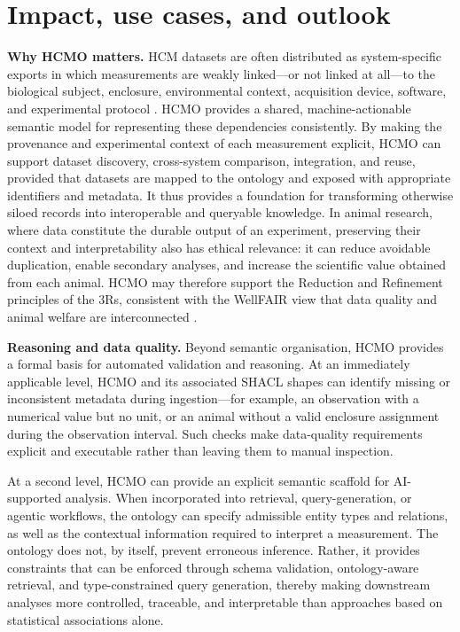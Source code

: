 \section{Impact, use cases, and outlook}
\textbf{Why HCMO matters.} HCM datasets are often distributed as system-specific exports in which measurements are weakly linked—or not linked at all—to the biological subject, enclosure, environmental context, acquisition device, software, and experimental protocol \cite{bains2025,forrest2026,petit2026wellfair}. HCMO provides a shared, machine-actionable semantic model for representing these dependencies consistently. By making the provenance and experimental context of each measurement explicit, HCMO can support dataset discovery, cross-system comparison, integration, and reuse, provided that datasets are mapped to the ontology and exposed with appropriate identifiers and metadata. It thus provides a foundation for transforming otherwise siloed records into interoperable and queryable knowledge. In animal research, where data constitute the durable output of an experiment, preserving their context and interpretability also has ethical relevance: it can reduce avoidable duplication, enable secondary analyses, and increase the scientific value obtained from each animal. HCMO may therefore support the Reduction and Refinement principles of the 3Rs, consistent with the WellFAIR view that data quality and animal welfare are interconnected \cite{petit2026wellfair}.

\textbf{Reasoning and data quality.}
Beyond semantic organisation, HCMO provides a formal basis for automated validation and reasoning. At an immediately applicable level, HCMO and its associated SHACL shapes can identify missing or inconsistent metadata during ingestion---for example, an observation with a numerical value but no unit, or an animal without a valid enclosure assignment during the observation interval. Such checks make data-quality requirements explicit and executable rather than leaving them to manual inspection.

At a second level, HCMO can provide an explicit semantic scaffold for AI-supported analysis. When incorporated into retrieval, query-generation, or agentic workflows, the ontology can specify admissible entity types and relations, as well as the contextual information required to interpret a measurement. The ontology does not, by itself, prevent erroneous inference. Rather, it provides constraints that can be enforced through schema validation, ontology-aware retrieval, and type-constrained query generation, thereby making downstream analyses more controlled, traceable, and interpretable than approaches based on statistical associations alone.

